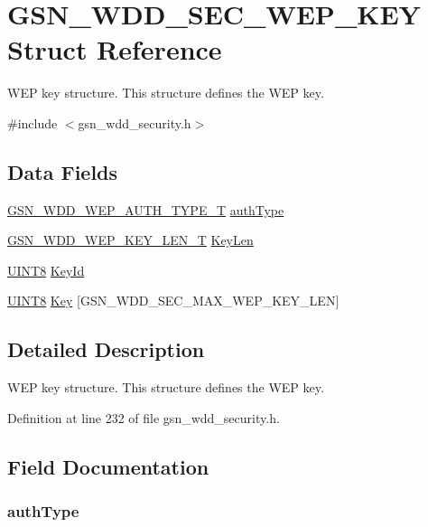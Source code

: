 \hypertarget{a00295}{
\section{GSN\_\-WDD\_\-SEC\_\-WEP\_\-KEY Struct Reference}
\label{a00295}
}


WEP key structure. This structure defines the WEP key.  




{\ttfamily \#include $<$gsn\_\-wdd\_\-security.h$>$}

\subsection*{Data Fields}
\begin{DoxyCompactItemize}
\item 
\hyperlink{a00604_a6ac85e9527841d5a5c60fcd76a0c5100}{GSN\_\-WDD\_\-WEP\_\-AUTH\_\-TYPE\_\-T} \hyperlink{a00295_a2d5dd7a35695e000029fb4f21ec128e6}{authType}
\item 
\hyperlink{a00604_a8c3a847d44b6c5df18ed812cf0efca62}{GSN\_\-WDD\_\-WEP\_\-KEY\_\-LEN\_\-T} \hyperlink{a00295_a4839acc8ac7df224398886c653505c1b}{KeyLen}
\item 
\hyperlink{a00660_gab27e9918b538ce9d8ca692479b375b6a}{UINT8} \hyperlink{a00295_aea28dbc428bcea36020d3e61b5402138}{KeyId}
\item 
\hyperlink{a00660_gab27e9918b538ce9d8ca692479b375b6a}{UINT8} \hyperlink{a00295_a08f93955d4fbddbd79be87fb9c45f4dc}{Key} \mbox{[}GSN\_\-WDD\_\-SEC\_\-MAX\_\-WEP\_\-KEY\_\-LEN\mbox{]}
\end{DoxyCompactItemize}


\subsection{Detailed Description}
WEP key structure. This structure defines the WEP key. 

Definition at line 232 of file gsn\_\-wdd\_\-security.h.



\subsection{Field Documentation}
\hypertarget{a00295_a2d5dd7a35695e000029fb4f21ec128e6}{
\subsubsection[{authType}]{ {\bf authType}}}
\label{a00295_a2d5dd7a35695e000029fb4f21ec128e6}


